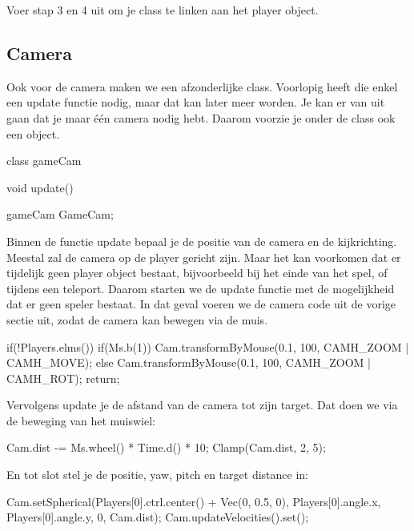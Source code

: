 \begin{exercise}
Voer stap 3 en 4 uit om je class te linken aan het player object.
\end{exercise}

\subsection{Camera}
Ook voor de camera maken we een afzonderlijke class. Voorlopig heeft die enkel een update functie nodig, maar dat kan later meer worden. Je kan er van uit gaan dat je maar \'e\'en camera nodig hebt. Daarom voorzie je onder de class ook een object.

\begin{code}
class gameCam
{
	void update() 
	{
	
	}
}
gameCam GameCam;
\end{code}

Binnen de functie update bepaal je de positie van de camera en de kijkrichting. Meestal zal de camera op de player gericht zijn. Maar het kan voorkomen dat er tijdelijk geen player object bestaat, bijvoorbeeld bij het einde van het spel, of tijdens een teleport. Daarom starten we de update functie met de mogelijkheid dat er geen speler bestaat. In dat geval voeren we de camera code uit de vorige sectie uit, zodat de camera kan bewegen via de muis.

\begin{code}
if(!Players.elms())
{
	 if(Ms.b(1)) {
			Cam.transformByMouse(0.1, 100, CAMH_ZOOM | CAMH_MOVE);
	 } else
	 {
			Cam.transformByMouse(0.1, 100, CAMH_ZOOM | CAMH_ROT);
	 }
	 return;
}
\end{code}

Vervolgens update je de afstand van de camera tot zijn target. Dat doen we via de beweging van het muiswiel:

\begin{code}
Cam.dist -= Ms.wheel() * Time.d() * 10;
Clamp(Cam.dist, 2, 5);
\end{code}

En tot slot stel je de positie, yaw, pitch en target distance in:

\begin{code}
Cam.setSpherical(Players[0].ctrl.center() + Vec(0, 0.5, 0), Players[0].angle.x, Players[0].angle.y, 0, Cam.dist);
Cam.updateVelocities().set();
\end{code}

